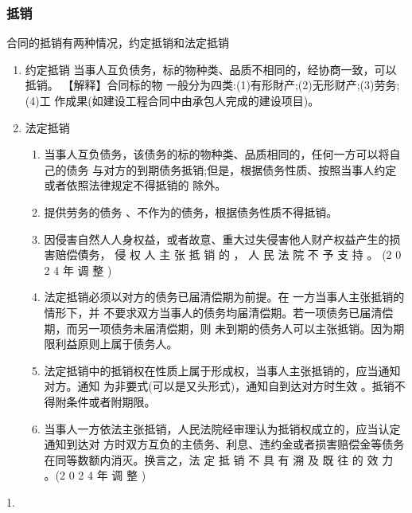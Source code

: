 \documentclass[UTF8,12pt]{ctexart}
\numberwithin{equation}{section} %
\numberwithin{figure}{section}
\numberwithin{table}{section}
\begin{document}
	\subsubsection{抵销}
	合同的抵销有两种情况，约定抵销和法定抵销
	\begin{enumerate}
		\item 约定抵销 当事人互负债务，标的物种类、品质不相同的，经协商一致，可以抵销。
		【解释】合同标的物 一般分为四类:(1)有形財产;(2)无形财产;(3)劳务;(4)工 作成果(如建设工程合同中由承包人完成的建设项目)。
		
		\item 法定抵销 
		\begin{enumerate}
			\item 当事人互负债务，该债务的标的物种类、品质相同的，任何一方可以将自己的债务 与对方的到期债务抵销;但是，根据债务性质、按照当事人约定或者依照法律规定不得抵销的 除外。
			
			\item 提供劳务的债务 、不作为的债务，根据债务性质不得抵销。
			
			\item 因侵害自然人人身权益，或者故意、重大过失侵害他人财产权益产生的损害赔偿債务， 侵 权 人 主 张 抵 销 的 ， 人 民 法 院 不 予 支 持 。 (2 0 2 4 年 调 整 )
			
			\item 法定抵销必须以对方的债务已届清偿期为前提。在 一方当事人主张抵销的情形下，并 不要求双方当事人的债务均届清偿期。若一项债务已届清偿期，而另一项债务未届清偿期，则 未到期的债务人可以主张抵销。因为期限利益原则上属于债务人。
			
			\item 法定抵销中的抵销权在性质上属于形成权，当事人主张抵销的，应当通知对方。通知 为非要式(可以是又头形式)，通知自到达对方时生效 。抵销不得附条件或者附期限。
			
			\item 当事人一方依法主张抵销，人民法院经审理认为抵销权成立的，应当认定通知到达对 方时双方互负的主债务、利息、违约金或者损害赔偿金等债务在同等数额内消灭。换言之，法 定 抵 销 不 具 有 溯 及 既 往 的 效 力 。(2 0 2 4 年 调 整 )
		\end{enumerate}
	\end{enumerate}
	1. 
	
	
	
\end{document}
